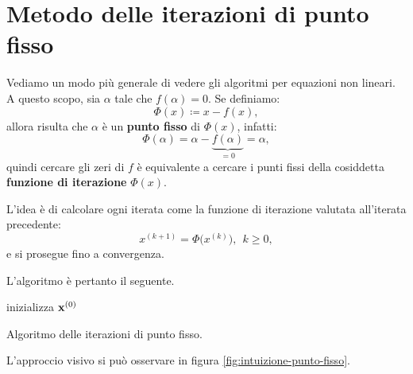 \section{Metodo delle iterazioni di punto fisso}
Vediamo un modo più generale di vedere gli algoritmi per equazioni non lineari.
A questo scopo, sia $\alpha $ tale che $f( \alpha ) =0$. Se definiamo:
\begin{equation}
	\Phi ( x) \coloneqq x-f( x) ,
\end{equation}
allora risulta che $\alpha $ è un \textbf{punto fisso} di $\Phi ( x)$, infatti:
\begin{equation*}
	\Phi ( \alpha ) =\alpha -\underbrace{f( \alpha )}_{=0} =\alpha,
\end{equation*}
quindi cercare gli zeri di $f$ è equivalente a cercare i punti fissi della cosiddetta \textbf{funzione di iterazione} $\Phi ( x)$.

L'idea è di calcolare ogni iterata come la funzione di iterazione valutata all'iterata precedente:
\begin{equation}
	x^{( k+1)} =\Phi \big( x^{(k)}\big) ,\ \ k\geqslant 0,
	\label{eq:iterazioni-punto-fisso}
\end{equation}
e si prosegue fino a convergenza.

L'algoritmo è pertanto il seguente.

\begin{algo}
	inizializza $\mathbf{x}^{(0)}$\;
	\caption{Algoritmo delle iterazioni di punto fisso.}
\end{algo}

L'approccio visivo si può osservare in figura \ref{fig:intuizione-punto-fisso}.

